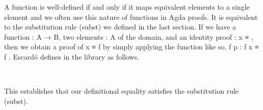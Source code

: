 A function is well-defined if and only if it maps equivalent elements to a single element and we often use this nature of functions in Agda proofs.  It is equivalent to the substitution rule (subst) we defined in the last section. If we have a function  \as : \ab A \as → \ab B, two elements   \as : \ab A of the domain, and an identity proof  \as : \ab x \ad ≡ , then we obtain a proof of  \ab x \ad ≡ \ab f  by simply applying the  function like so,  \ab f \ab p \as : \ab f \ab x \ad ≡ \ab f . Escardó defines  in the \typetopology library as follows.
\ccpad
\begin{code}%
\>[1]\AgdaSpace{}%
\AgdaSymbol{:}\AgdaSpace{}%
\AgdaSymbol{(}\AgdaSpace{}%
\AgdaSymbol{:}\AgdaSpace{}%
\AgdaSpace{}%
\AgdaSpace{}%
\AgdaSymbol{)\{}\AgdaSpace{}%
\AgdaSpace{}%
\AgdaSymbol{:}\AgdaSpace{}%
\AgdaSymbol{\}}\AgdaSpace{}%
\AgdaSpace{}%
\AgdaSpace{}%
\AgdaSpace{}%
\AgdaSpace{}%
\AgdaSpace{}%
\AgdaSpace{}%
\AgdaSpace{}%
\AgdaSpace{}%
\AgdaSpace{}%
\<%
\\
%
\>[1]\AgdaSpace{}%
\AgdaSpace{}%
\AgdaSymbol{\{}\AgdaSymbol{\}}\AgdaSpace{}%
\AgdaSpace{}%
\AgdaSymbol{=}\AgdaSpace{}%
\AgdaSpace{}%
\AgdaSpace{}%
\AgdaBound{-}\AgdaSpace{}%
\AgdaSpace{}%
\AgdaSpace{}%
\AgdaSpace{}%
\AgdaSpace{}%
\AgdaSpace{}%
\AgdaBound{-}\AgdaSymbol{)}\AgdaSpace{}%
\AgdaSpace{}%
\AgdaSymbol{(}\AgdaSpace{}%
\AgdaSymbol{\{}\AgdaSpace{}%
\AgdaSymbol{=}\AgdaSpace{}%
\AgdaSpace{}%
\AgdaSymbol{\})}\<%
\end{code}
\ccpad
This establishes that our definitional equality satisfies the substitution rule (subst).

